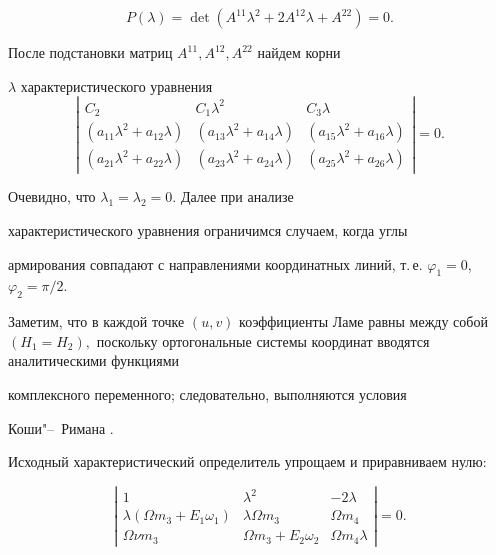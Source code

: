 $$P(\lambda)=\det(A^{11}\lambda^2+2A^{12}\lambda+A^{22})=0.$$

После подстановки матриц $A^{11},A^{12},A^{22}$ найдем корни

$\lambda$ характеристического уравнения \[ \left|

\begin{array}{ccc}

C_2&C_1\lambda^2& C_3\lambda\\

(a_{11}\lambda^2+a_{12}\lambda)&(a_{13}\lambda^2+a_{14}\lambda) &(a_{15}\lambda^2+a_{16}\lambda) \\

(a_{21}\lambda^2+a_{22}\lambda)&(a_{23}\lambda^2+a_{24}\lambda)

&(a_{25}\lambda^2+a_{26}\lambda)

\end{array}

\right|=0.

\]

Очевидно, что $\lambda_1=\lambda_2=0.$ Далее при анализе

характеристического уравнения ограничимся случаем, когда углы

армирования совпадают с направлениями координатных линий, т.\,е. $\varphi_1=0$, $\varphi_2={\pi}/{2}.$ 

Заметим, что в каждой точке $(u, v)$ коэффициенты Ламе равны между собой $(H_1=H_2),$ поскольку ортогональные системы координат вводятся  аналитическими функциями

комплексного переменного; следовательно, выполняются условия

Коши"--~Римана \cite{FeodorovaNA:Lavr}. 

Исходный характеристический определитель упрощаем и приравниваем нулю:

\begin{equation} 

\label{FeodorovaNA:or75}

\left|

\begin{array}{ccc}

1&\lambda^2& -2\lambda\\

\lambda(\Omega m_3+E_1\omega_1)&\lambda \Omega m_3 &\Omega m_4 \\

\Omega\nu m_3 &\Omega m_3+E_2\omega_2&\Omega m_4\lambda

\end{array} \right|=0.

\end{equation}

